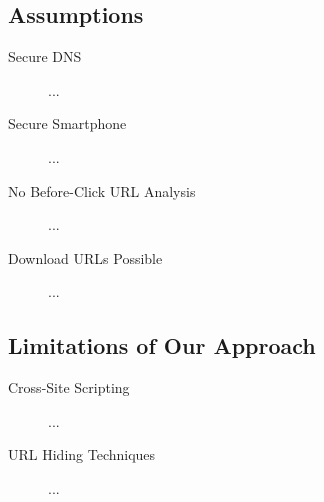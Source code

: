 \subsection{Assumptions}
\begin{description}
	\item[Secure DNS] ...
	\item[Secure Smartphone] ...
	\item[No Before-Click URL Analysis] ...
	\item[Download URLs Possible] ...
\end{description}

\subsection{Limitations of Our Approach}
\begin{description}
	\item[Cross-Site Scripting] ...
	\item[URL Hiding Techniques] ...
\end{description}

